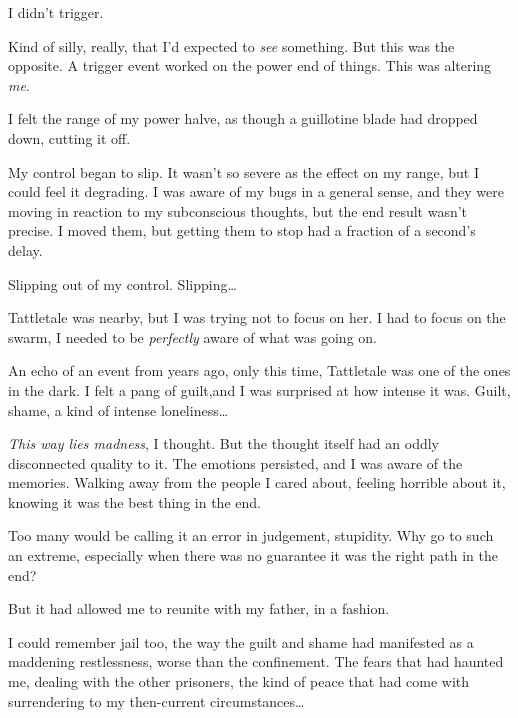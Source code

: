 





I didn't trigger.



Kind of silly, really, that I'd expected to \emph{see} something.  But this was the opposite.  A trigger event worked on the power end of things.  This was altering \emph{me}.



I felt the range of my power halve, as though a guillotine blade had dropped down, cutting it off.



My control began to slip.  It wasn't so severe as the effect on my range, but I could feel it degrading.  I was aware of my bugs in a general sense, and they were moving in reaction to my subconscious thoughts, but the end result wasn't precise.  I moved them, but getting them to stop had a fraction of a second's delay.



Slipping out of my control.  Slipping\ldots



Tattletale was nearby, but I was trying not to focus on her.  I had to focus on the swarm, I needed to be \emph{perfectly} aware of what was going on.



An echo of an event from years ago, only this time, Tattletale was one of the ones in the dark.  I felt a pang of guilt,and I was surprised at how intense it was.  Guilt, shame, a kind of intense loneliness\ldots



\emph{This way lies madness}, I thought.  But the thought itself had an oddly disconnected quality to it.  The emotions persisted, and I was aware of the memories.  Walking away from the people I cared about, feeling horrible about it, knowing it was the best thing in the end.



Too many would be calling it an error in judgement, stupidity.  Why go to such an extreme, especially when there was no guarantee it was the right path in the end?



But it had allowed me to reunite with my father, in a fashion.



I could remember jail too, the way the guilt and shame had manifested as a maddening restlessness, worse than the confinement.  The fears that had haunted me, dealing with the other prisoners, the kind of peace that had come with surrendering to my then-current circumstances\ldots



